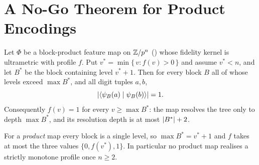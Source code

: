 \section{A No-Go Theorem for Product Encodings}
\label{sec:theorem-a}

\begin{theorem}[Product no-go]
  \label{thm:product-nogo}
  Let $\Phi$ be a block-product feature map on $\mathbb{Z}/p^{n}$ ()
  whose fidelity kernel is ultrametric with profile $f$. Put
  $v^{*} = \min\{\, v : f(v) > 0 \,\}$ and assume $v^{*} < n$, and let $B^{*}$ be the
  block containing level $v^{*}+1$. Then for every block $B$ all of whose levels exceed
  $\max B^{*}$, and all digit tuples $a, b$,
  \begin{equation}
    \label{eq:trivial-block}
    \lvert\langle \psi_B(a) \mid \psi_B(b) \rangle\rvert = 1 .
  \end{equation}
  Consequently $f(v) = 1$ for every $v \ge \max B^{*}$: the map resolves the tree only
  to depth $\max B^{*}$, and its resolution depth is at most $\lvert B^{*}\rvert + 2$.

  For a \emph{product} map every block is a single level, so $\max B^{*} = v^{*}+1$ and
  $f$ takes at most the three values $\{0, f(v^{*}), 1\}$. In particular no product map
  realises a strictly monotone profile once $n \ge 2$.
\end{theorem}

